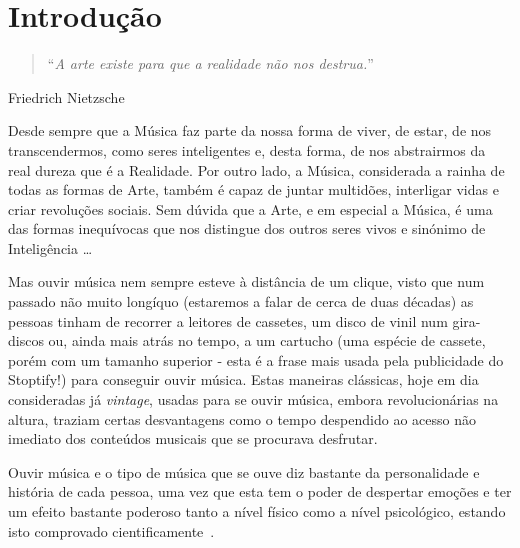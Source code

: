 \documentclass{report}
\begin{document}

\chapter{Introdução}
\label{chap.introducao}

\begin{quote}
``\emph{A arte existe para que a realidade não nos destrua.}''
\end{quote}
\begin{flushright}
Friedrich Nietzsche
\end{flushright}


Desde sempre que a Música faz parte da nossa forma de viver, de estar, de nos transcendermos, como seres inteligentes e, desta forma, de nos abstrairmos da real dureza que é a Realidade. Por outro lado, a Música, considerada a rainha de todas as formas de Arte, também é capaz de juntar multidões, interligar vidas e criar revoluções sociais. Sem dúvida que a Arte, e em especial a Música, é uma das formas inequívocas que nos distingue dos outros seres vivos e sinónimo de Inteligência \ldots

Mas ouvir música nem sempre esteve à distância de um clique, visto que num passado não muito longíquo (estaremos a falar de cerca de duas décadas) as pessoas tinham de recorrer a leitores de cassetes, um disco de vinil num gira-discos ou, ainda mais atrás no tempo, a um cartucho (uma espécie de cassete, porém com um tamanho superior - esta é a frase mais usada pela publicidade do Stoptify!) para conseguir ouvir música. Estas maneiras clássicas, hoje em dia consideradas já \textit{vintage}, usadas para se ouvir música, embora revolucionárias na altura, traziam certas desvantagens como o tempo despendido ao acesso não imediato dos conteúdos musicais que se procurava desfrutar.

Ouvir música e o tipo de música que se ouve diz bastante da personalidade e história de cada pessoa, uma vez que esta tem o poder de despertar emoções e ter um efeito bastante poderoso tanto a nível físico como a nível psicológico, estando isto comprovado cientificamente~\cite{donaldahodges2000}.

\end{document}

